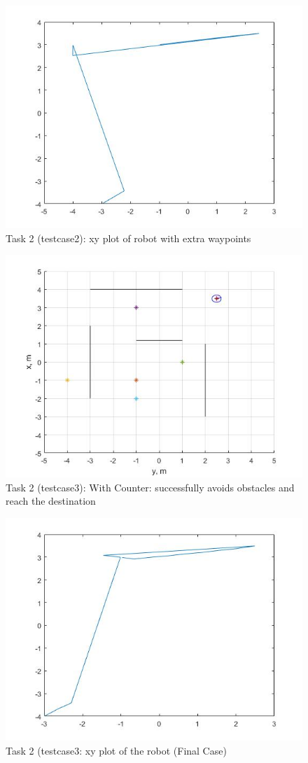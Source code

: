 \documentclass{l4proj}
\begin{document}
\begin{figure}[htb]
    \centering
    \includegraphics[width=0.5\linewidth]{images/task2test2xyplot.jpg}

    \caption{Task 2 (testcase2): xy plot of robot with extra waypoints}
    \label{fig:Model1sim4} 
\end{figure}
\begin{figure}[htb]
    \centering
    \includegraphics[width=0.5\linewidth]{images/task2test3robot.jpg}

    \caption{Task 2 (testcase3): With Counter: successfully avoids obstacles and reach the destination}
    \label{fig:Model1sim4} 
\end{figure}
\begin{figure}[htb]
    \centering
    \includegraphics[width=0.5\linewidth]{images/task2test3xyplot.jpg}

    \caption{Task 2 (testcase3: xy plot of the robot (Final Case)}
    \label{fig:Model1sim4} 
\end{figure}
\end{document}
